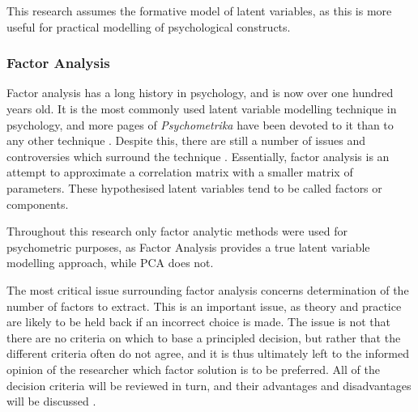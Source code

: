 This research assumes the formative model of latent variables, as this is more useful for practical modelling of psychological constructs. 

\subsubsection{Factor Analysis}

Factor analysis has a long history in psychology, and is now over one hundred years old. It is the most commonly used latent variable modelling technique in psychology, and more pages of \textit{Psychometrika} have been devoted to it than to any other technique \cite{henson2006use}.  Despite this, there are still a number of issues and controversies which surround the technique \cite{sass2010comparative}.  Essentially, factor analysis is an attempt to approximate a correlation matrix with a smaller matrix of parameters.  These hypothesised latent variables tend to be called factors or components.


Throughout this research only factor analytic methods were used for psychometric purposes, as Factor Analysis provides a true latent variable modelling approach, while PCA does not. 

The most critical issue surrounding factor analysis concerns determination of the number of factors to extract\cite{zwick1986comparison}.  This is an important issue, as theory and practice are likely to be held back if an incorrect choice is made.  The issue is not that there are no criteria on which to base a principled decision, but rather that the different criteria often do not agree, and it is thus ultimately left to the informed opinion of the researcher which factor solution is to be preferred.  All of the decision criteria will be reviewed in turn, and their advantages and disadvantages will be discussed \cite{henson2006use}. 


